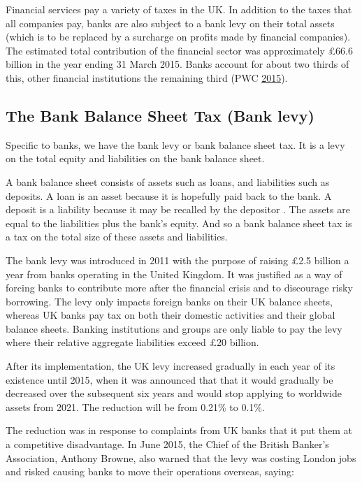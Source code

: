 \documentclass[]{tufte-handout}
\begin{document}
Financial services pay a variety of taxes in the UK. In addition to the
taxes that all companies pay, banks are also subject to a bank levy on
their total assets (which is to be replaced by a surcharge on profits
made by financial companies). The estimated total contribution of the
financial sector was approximately £66.6 billion in the year ending 31
March 2015. Banks account for about two thirds of this, other financial
institutions the remaining third (PWC
\protect\hyperlink{ref-PWC2015}{2015}).

\hypertarget{the-bank-balance-sheet-tax-bank-levy}{%
\subsection{The Bank Balance Sheet Tax (Bank
levy)}\label{the-bank-balance-sheet-tax-bank-levy}}

Specific to banks, we have the bank levy or bank balance sheet tax. It
is a levy on the total equity and liabilities on the bank balance sheet.

A bank balance sheet consists of assets such as loans, and liabilities
such as deposits. A loan is an asset because it is hopefully paid back
to the bank. A deposit is a liability because it may be recalled by the
depositor . The assets are equal to the liabilities plus the bank's
equity. And so a bank balance sheet tax is a tax on the total size of
these assets and liabilities.

The bank levy was introduced in 2011 with the purpose of raising £2.5
billion a year from banks operating in the United Kingdom. It was
justified as a way of forcing banks to contribute more after the
financial crisis and to discourage risky borrowing. The levy only
impacts foreign banks on their UK balance sheets, whereas UK banks pay
tax on both their domestic activities and their global balance sheets.
Banking institutions and groups are only liable to pay the levy where
their relative aggregate liabilities exceed £20 billion.

After its implementation, the UK levy increased gradually in each year
of its existence until 2015, when it was announced that that it would
gradually be decreased over the subsequent six years and would stop
applying to worldwide assets from 2021. The reduction will be from
0.21\% to 0.1\%.

The reduction was in response to complaints from UK banks that it put
them at a competitive disadvantage. In June 2015, the Chief of the
British Banker's Association, Anthony Browne, also warned that the levy
was costing London jobs and risked causing banks to move their
operations overseas, saying:
\end{document}
